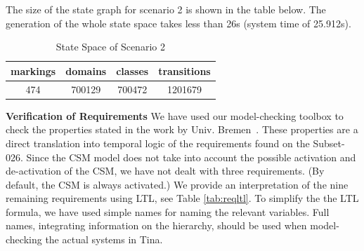 The size of the state graph for scenario 2 is shown in the table
below. The generation of the whole state space takes less than 26s
(system time of 25.912s).


\begin{table}[ht!]
\caption{State Space of Scenario 2}
\footnotesize
\begin{center}
  \begin{tabular}{|c|c|c|c|}
    \hline
    markings & domains & classes & transitions \\
    \hline
    474 & 700129	 & 700472 & 1201679 \\ 
    \hline
  \end{tabular}
\end{center}
\end{table}

\textbf{Verification of Requirements} 
We have used our model-checking toolbox to check the properties stated
in the work by Univ. Bremen~\cite{csmwp4}. These properties are a
direct translation into temporal logic of the requirements found on
the Subset-026. Since the CSM model does not take into
account the possible activation and de-activation of the CSM, we have
not dealt with three requirements. (By default, the CSM is always
activated.) We provide an interpretation of the nine remaining
requirements using LTL, see Table \ref{tab:reqltl}. To simplify the
the LTL formula, we have used simple names for naming the relevant
variables. Full names, integrating information on the hierarchy,
should be used when model-checking the actual systems in Tina.


